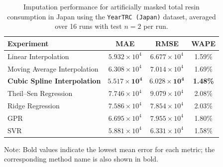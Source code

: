 \begin{table}[H]
	\caption{ Imputation performance for artificially masked total resin consumption in Japan using the \texttt{YearTRC (Japan)} dataset, averaged over 16 runs with test \(n=2\) per run.}
	\begin{tabularx}{\textwidth}{lCCC}
		\toprule
		\textbf{Experiment} & \textbf{MAE} & \textbf{RMSE} & \textbf{WAPE} \\
		\midrule
		Linear Interpolation & \(5.932 \times 10^{4}\) & \(6.677 \times 10^{4}\) & 1.59\% \\
		Moving Average Interpolation & \(6.308 \times 10^{4}\) & \(7.014 \times 10^{4}\) & 1.69\% \\
		\textbf{Cubic Spline Interpolation} & \(\mathbf{5.517 \times 10^{4}}\) & \(\mathbf{6.028 \times 10^{4}}\) & \textbf{1.48\%} \\
		Theil--Sen Regression & \(7.746 \times 10^{4}\) & \(9.079 \times 10^{4}\) & 2.08\% \\
		Ridge Regression & \(7.586 \times 10^{4}\) & \(7.854 \times 10^{4}\) & 2.03\% \\
		GPR & \(6.695 \times 10^{4}\) & \(7.955 \times 10^{4}\) & 1.80\% \\
		SVR & \(5.881 \times 10^{4}\) & \(6.331 \times 10^{4}\) & 1.58\% \\
		\bottomrule
	\end{tabularx}
	\smallskip
	{\footnotesize
	Note: Bold values indicate the lowest mean error for each metric; the corresponding method name is also shown in bold.\par
	}
	\label{tab:imputation_japan_trc}
\end{table}
